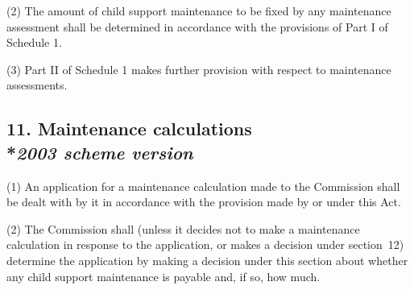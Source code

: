 \documentclass[12pt,a4paper]{article}
\begin{document}
(2) The amount of child support maintenance to be fixed by any maintenance assessment shall be determined in accordance with the provisions of Part I of Schedule 1.

(3) Part II of Schedule 1 makes further provision with respect to maintenance assessments.


\subsection[11. Maintenance calculations --- \emph{2003 scheme version}]{11. Maintenance calculations\\*\emph{2003 scheme version}}

(1) An application for a maintenance calculation made to the 
Commission  %
shall be dealt with by 
it  %
in accordance with the provision made by or under this Act.

(2) The 
Commission  %
shall (unless 
it  %
decides not to make a maintenance calculation in response to the application, or makes a decision under section~12) determine the application by making a decision under this section about whether any child support maintenance is payable and, if so, how much.
\end{document}
